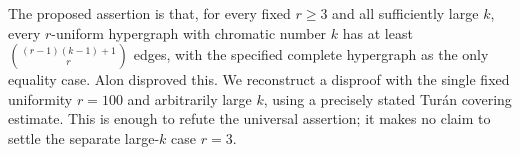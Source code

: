 The proposed assertion is that, for every fixed $r\ge3$ and all sufficiently large $k$, every $r$-uniform hypergraph with chromatic number $k$ has at least $\binom{(r-1)(k-1)+1}{r}$ edges, with the specified complete hypergraph as the only equality case. Alon disproved this. We reconstruct a disproof with the single fixed uniformity $r=100$ and arbitrarily large $k$, using a precisely stated Tur\'an covering estimate. This is enough to refute the universal assertion; it makes no claim to settle the separate large-$k$ case $r=3$.
